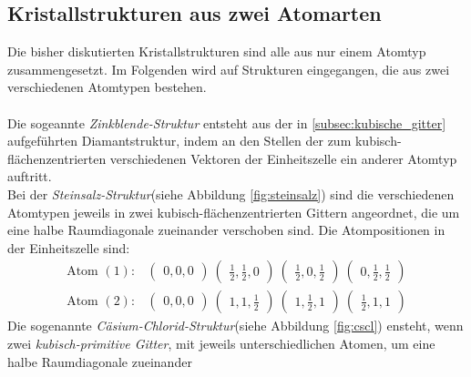\subsection{Kristallstrukturen aus zwei Atomarten}
\label{subsec:2atome}
Die bisher diskutierten Kristallstrukturen sind alle aus nur
einem Atomtyp zusammengesetzt. Im Folgenden wird auf Strukturen
eingegangen, die aus zwei verschiedenen Atomtypen bestehen.\\ \\
Die sogeannte \textit{Zinkblende-Struktur} entsteht aus der
in \ref{subsec:kubische_gitter}
aufgeführten Diamantstruktur, indem an den Stellen der zum
kubisch-flächenzentrierten verschiedenen Vektoren der Einheitszelle
ein anderer Atomtyp auftritt.\\
Bei der \textit{Steinsalz-Struktur}(siehe Abbildung \ref{fig:steinsalz})
sind die verschiedenen Atomtypen
jeweils in zwei kubisch-flächenzentrierten Gittern angeordnet, die um eine
halbe Raumdiagonale zueinander verschoben sind. Die Atompositionen
in der Einheitszelle sind:
\begin{align}
  \label{eqn:5*}
  \text{Atom }(1) :&
  \begin{pmatrix}
    0, 0, 0
  \end{pmatrix}\
  \begin{pmatrix}
    \frac{1}{2}, \frac{1}{2}, 0
  \end{pmatrix}\
  \begin{pmatrix}
    \frac{1}{2}, 0, \frac{1}{2}
  \end{pmatrix}\
  \begin{pmatrix}
    0, \frac{1}{2}, \frac{1}{2}
  \end{pmatrix}\\
  \label{eqn:6*}
  \text{Atom }(2) :&
  \begin{pmatrix}
    0, 0, 0
  \end{pmatrix}\
  \begin{pmatrix}
    1, 1, \frac{1}{2}
  \end{pmatrix}\
  \begin{pmatrix}
    1, \frac{1}{2}, 1
  \end{pmatrix}\
  \begin{pmatrix}
    \frac{1}{2}, 1, 1
   \end{pmatrix}
\end{align}
Die sogenannte \textit{Cäsium-Chlorid-Struktur}(siehe Abbildung \ref{fig:cscl})
ensteht, wenn zwei \textit{kubisch-primitive Gitter}, mit jeweils
unterschiedlichen Atomen, um eine halbe Raumdiagonale zueinander
